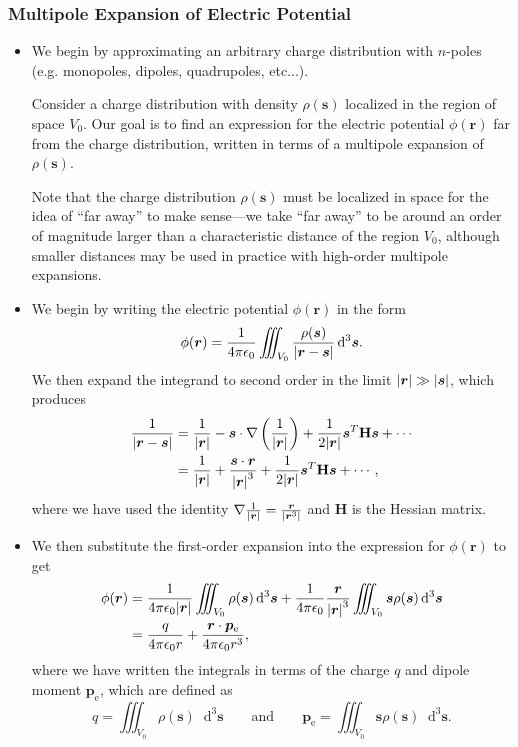 \documentclass[11pt, a4paper]{article}
\newcommand{\diff}{\mathop{}\!\mathrm{d}} %
\newcommand{\eqtext}[1]{\qquad \text{#1} \qquad}
\renewcommand{\vec}[1]{\bm{#1}} %
\newcommand{\mat}[1]{\mathbf{#1}} %
\renewcommand{\r}{\vec{r}}
\newcommand{\ee}{\epsilon_{0}}  %
\newcommand{\pe}{\vec{p}_{\text{e}}}  %
\newcommand{\s}{\vec{s}}  %
\newcommand{\ds}{\diff^{3} \s}  %
\renewcommand{\grad}{\nabla}
\begin{document}
\subsubsection{Multipole Expansion of Electric Potential}
\begin{itemize}
	\item We begin by approximating an arbitrary charge distribution with $ n $-poles (e.g. monopoles, dipoles, quadrupoles, etc...).
	
    Consider a charge distribution with density $ \rho(\s) $ localized in the region of space $ V_{0} $. Our goal is to find an expression for the electric potential $ \phi(\r) $ far from the charge distribution, written in terms of a multipole expansion of $ \rho(\s) $.
	
    Note that the charge distribution $ \rho(\s) $ must be localized in space for the idea of ``far away'' to make sense---we take ``far away'' to be around an order of magnitude larger than a characteristic distance of the region $ V_{0} $, although smaller distances may be used in practice with high-order multipole expansions.

    \item We begin by writing the electric potential $ \phi(\r) $ in the form
	\begin{equation*}
		\phi(\r) = \frac{1}{4\pi \ee}\iiint_{V_{0}}\frac{\rho(\s)}{\abs{\r - \s}} \ds.
	\end{equation*}
    We then expand the integrand to second order in the limit $ \abs{\r} \gg \abs{\s}  $, which produces
	\begin{align*}
        \frac{1}{\abs{\r - \s}} &= \frac{1}{\abs{\r}} - \s \cdot \grad\left(\frac{1}{\abs{\r}}\right) + \frac{1}{2\abs{\r}} \s^{T}\mat{H}\s + \cdots\\
        &= \frac{1}{\abs{\r}} + \frac{\s \cdot \r}{\abs{\r}^{3}} + \frac{1}{2\abs{\r}} \s^{T}\mat{H}\s + \cdots,
	\end{align*}
    where we have used the identity $ \grad \frac{1}{\abs{\r}} = \frac{\r}{\abs{\r^{3}}} $ and $ \mat{H} $ is the Hessian matrix.

    \item We then substitute the first-order expansion into the expression for $ \phi(\r) $ to get
	\begin{align*}
		\phi(\r) &= \frac{1}{4\pi \ee \abs{\r}}\iiint_{V_{0}} \rho(\s) \ds + \frac{1}{4\pi \ee}\frac{\r}{\abs{\r}^{3}}\iiint_{V_{0}} \s \rho(\s)\ds\\
		& = \frac{q}{4\pi \ee r} + \frac{\r \cdot \pe}{4\pi \ee r^{3}},
	\end{align*}
    where we have written the integrals in terms of the charge $ q $ and dipole moment $ \pe $, which are defined as
	\begin{equation*}
		q = \iiint_{V_{0}} \rho(\s) \ds \eqtext{and} \pe = \iiint_{V_{0}} \s \rho(\s) \ds.
	\end{equation*}
	

\end{itemize}
\end{document}
